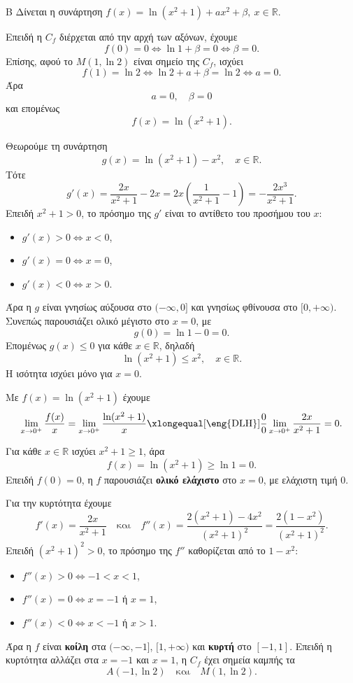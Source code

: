 \begin{thema}{Β}
Δίνεται η συνάρτηση $f(x)=\ln(x^2+1)+ax^2+\beta,\ x\in\mathbb{R}$.

\begin{erwthma}
\item Επειδή η $C_f$ διέρχεται από την αρχή των αξόνων, έχουμε
\[
f(0)=0\Leftrightarrow \ln 1+\beta=0\Leftrightarrow \beta=0.
\]
Επίσης, αφού το $M(1,\ln2)$ είναι σημείο της $C_f$, ισχύει
\[
f(1)=\ln2\Leftrightarrow \ln2+a+\beta=\ln2\Leftrightarrow a=0.
\]
Άρα
\[
a=0,\quad \beta=0
\]
και επομένως
\[
f(x)=\ln(x^2+1).
\]

\item Θεωρούμε τη συνάρτηση
\[
g(x)=\ln(x^2+1)-x^2,\quad x\in\mathbb{R}.
\]
Τότε
\[
g'(x)=\frac{2x}{x^2+1}-2x
=2x\left(\frac{1}{x^2+1}-1\right)
=-\frac{2x^3}{x^2+1}.
\]
Επειδή $x^2+1>0$, το πρόσημο της $g'$ είναι το αντίθετο του προσήμου του $x$:
\begin{itemize}
\item $g'(x)>0\Leftrightarrow x<0$,
\item $g'(x)=0\Leftrightarrow x=0$,
\item $g'(x)<0\Leftrightarrow x>0$.
\end{itemize}
Άρα η $g$ είναι γνησίως αύξουσα στο $(-\infty,0]$ και γνησίως φθίνουσα στο $[0,+\infty)$. Συνεπώς παρουσιάζει ολικό μέγιστο στο $x=0$, με
\[
g(0)=\ln1-0=0.
\]
Επομένως $g(x)\leq0$ για κάθε $x\in\mathbb{R}$, δηλαδή
\[
\ln(x^2+1)\leq x^2,\quad x\in\mathbb{R}.
\]
Η ισότητα ισχύει μόνο για $x=0$.

\item Με $f(x)=\ln(x^2+1)$ έχουμε
\[
\lim_{x\to0^+}\frac{f(x)}{x}
=\lim_{x\to0^+}\frac{\ln(x^2+1)}{x}
\xlongequal[\text{\eng{DLH}}]{\frac{0}{0}}
\lim_{x\to0^+}\frac{2x}{x^2+1}=0.
\]

\item Για κάθε $x\in\mathbb{R}$ ισχύει $x^2+1\geq1$, άρα
\[
f(x)=\ln(x^2+1)\geq\ln1=0.
\]
Επειδή $f(0)=0$, η $f$ παρουσιάζει \textbf{ολικό ελάχιστο} στο $x=0$, με ελάχιστη τιμή $0$.

Για την κυρτότητα έχουμε
\[
f'(x)=\frac{2x}{x^2+1}
\quad\text{και}\quad
f''(x)=\frac{2(x^2+1)-4x^2}{(x^2+1)^2}
=\frac{2(1-x^2)}{(x^2+1)^2}.
\]
Επειδή $(x^2+1)^2>0$, το πρόσημο της $f''$ καθορίζεται από το $1-x^2$:
\begin{itemize}
\item $f''(x)>0\Leftrightarrow -1<x<1$,
\item $f''(x)=0\Leftrightarrow x=-1$ ή $x=1$,
\item $f''(x)<0\Leftrightarrow x<-1$ ή $x>1$.
\end{itemize}
Άρα η $f$ είναι \textbf{κοίλη} στα $(-\infty,-1]$, $[1,+\infty)$ και \textbf{κυρτή} στο $[-1,1]$. Επειδή η κυρτότητα αλλάζει στα $x=-1$ και $x=1$, η $C_f$ έχει σημεία καμπής τα
\[
A(-1,\ln2)
\quad\text{και}\quad
M(1,\ln2).
\]
\end{erwthma}
\end{thema}
